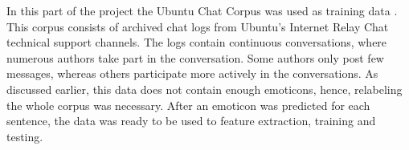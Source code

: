 In this part of the project the Ubuntu Chat Corpus was used as training data \cite{ubuntudata}. This corpus consists of archived chat logs from Ubuntu's Internet Relay Chat technical support channels. The logs contain continuous conversations, where numerous authors take part in the conversation. Some authors only post few messages, whereas others participate more actively in the conversations. As discussed earlier, this data does not contain enough emoticons, hence, relabeling the whole corpus was necessary. After an emoticon was predicted for each sentence, the data was ready to be used to feature extraction, training and testing.


\begin{comment}

\subsubsection*{Relabelling the data} 
Since this data contains mainly technical conversations, there appeared to be a significant lack of emoticons. This means that the majority of the messages were labelled as `neutral', which in turn implies a terribly biased prediction performance. In order to use this data and test the prediction performance, the decision was made to relabel the data. For every `neutral' message, an emoticon was predicted using the AMP discussed in section \ref{sec:twitter}. This lead to the acquisition of data containing enough emoticons to properly train a model and predict new examples. In order to avoid such artificial relabelling of the data in other projects, corpora from a more appropriate source should be used - e.g. Skype conversation logs or any other group chat logs.
\end{comment}